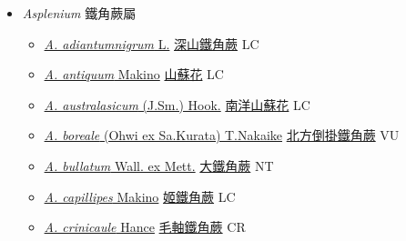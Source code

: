 
  \begin{itemize}
 \item[] \textit{Asplenium} 鐵角蕨屬
                    
  \begin{itemize}
        \item[] \href{http://www.theplantlist.org/tpl1.1/search?q=Asplenium+adiantumnigrum}{\textit{A. adiantumnigrum} L.}   \href{\detokenize{http://taibnet.sinica.edu.tw/chi/taibnet_species_list.php?T2=深山鐵角蕨&T2_new_value=true&fr=y}}{深山鐵角蕨} LC
        \item[] \href{http://www.theplantlist.org/tpl1.1/search?q=Asplenium+antiquum}{\textit{A. antiquum} Makino}   \href{\detokenize{http://taibnet.sinica.edu.tw/chi/taibnet_species_list.php?T2=山蘇花&T2_new_value=true&fr=y}}{山蘇花} LC
        \item[] \href{http://www.theplantlist.org/tpl1.1/search?q=Asplenium+australasicum}{\textit{A. australasicum} (J.Sm.) Hook.}   \href{\detokenize{http://taibnet.sinica.edu.tw/chi/taibnet_species_list.php?T2=南洋山蘇花&T2_new_value=true&fr=y}}{南洋山蘇花} LC
        \item[] \href{http://www.theplantlist.org/tpl1.1/search?q=Asplenium+boreale}{\textit{A. boreale} (Ohwi ex Sa.Kurata) T.Nakaike}   \href{\detokenize{http://taibnet.sinica.edu.tw/chi/taibnet_species_list.php?T2=北方倒掛鐵角蕨&T2_new_value=true&fr=y}}{北方倒掛鐵角蕨} VU
        \item[] \href{http://www.theplantlist.org/tpl1.1/search?q=Asplenium+bullatum}{\textit{A. bullatum} Wall. ex Mett.}   \href{\detokenize{http://taibnet.sinica.edu.tw/chi/taibnet_species_list.php?T2=大鐵角蕨&T2_new_value=true&fr=y}}{大鐵角蕨} NT
        \item[] \href{http://www.theplantlist.org/tpl1.1/search?q=Asplenium+capillipes}{\textit{A. capillipes} Makino}   \href{\detokenize{http://taibnet.sinica.edu.tw/chi/taibnet_species_list.php?T2=姬鐵角蕨&T2_new_value=true&fr=y}}{姬鐵角蕨} LC
        \item[] \href{http://www.theplantlist.org/tpl1.1/search?q=Asplenium+crinicaule}{\textit{A. crinicaule} Hance}   \href{\detokenize{http://taibnet.sinica.edu.tw/chi/taibnet_species_list.php?T2=毛軸鐵角蕨&T2_new_value=true&fr=y}}{毛軸鐵角蕨} CR

\end{itemize}
\end{itemize}
